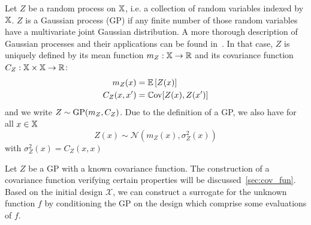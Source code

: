 \documentclass[../../Main_ManuscritThese.tex]{subfiles}
\begin{document}
\begin{definition}
  Let $Z$ be a random process on $\mathbb{X}$, i.e. a collection of random variables indexed by $\mathbb{X}$. $Z$ is a Gaussian process (GP) if any finite number of those random variables have a multivariate joint Gaussian distribution.  A more thorough description of Gaussian processes and their applications can be found in~\cite{rasmussen_gaussian_2006}.
  In that case, $Z$ is uniquely defined by its mean function $m_Z:\mathbb{X} \rightarrow \mathbb{R}$ and its covariance function $C_Z:\mathbb{X} \times \mathbb{X} \rightarrow \mathbb{R}$:
  \begin{align}
    m_Z(x) &= \mathbb{E}\left[Z(x)\right] \\
    C_Z(x, x^{\prime}) &= \mathbb{C}\mathrm{ov}[Z(x), Z(x^{\prime})]
  \end{align}
  and we write $Z \sim \operatorname{\mathrm{GP}}(m_Z, C_Z)$.
  Due to the definition of a GP, we also have for all $x\in \mathbb{X}$
  \begin{equation}
    Z(x) \sim \mathcal{N}(m_Z(x), \sigma^2_Z(x)) 
  \end{equation}
  with $\sigma_Z^2(x) = C_Z(x, x)$
\end{definition}

Let $Z$ be a GP with a known covariance function. The construction of a covariance function verifying certain properties will be discussed~\cref{sec:cov_fun}.
Based on the initial design $\mathcal{X}$, we can construct a surrogate for the unknown function $f$ by conditioning the GP on the design which comprise some evaluations of $f$.   
\end{document}
